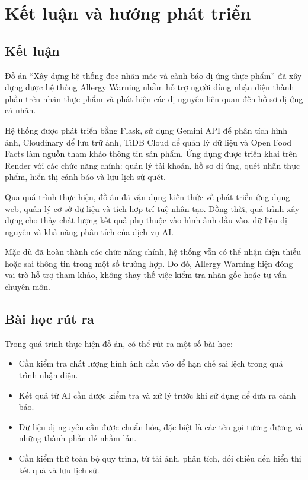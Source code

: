 
\chapter{Kết luận và hướng phát triển}
\label{ch:ketluan}

\section{Kết luận}

Đồ án ``Xây dựng hệ thống đọc nhãn mác và cảnh báo dị ứng thực
phẩm'' đã xây dựng được hệ thống Allergy Warning nhằm hỗ trợ
người dùng nhận diện thành phần trên nhãn thực phẩm và phát hiện
các dị nguyên liên quan đến hồ sơ dị ứng cá nhân.

Hệ thống được phát triển bằng Flask, sử dụng Gemini API để phân
tích hình ảnh, Cloudinary để lưu trữ ảnh, TiDB Cloud để quản lý
dữ liệu và Open Food Facts làm nguồn tham khảo thông tin sản phẩm.
Ứng dụng được triển khai trên Render với các chức năng chính:
quản lý tài khoản, hồ sơ dị ứng, quét nhãn thực phẩm, hiển thị
cảnh báo và lưu lịch sử quét.

Qua quá trình thực hiện, đồ án đã vận dụng kiến thức về phát triển
ứng dụng web, quản lý cơ sở dữ liệu và tích hợp trí tuệ nhân tạo.
Đồng thời, quá trình xây dựng cho thấy chất lượng kết quả phụ thuộc
vào hình ảnh đầu vào, dữ liệu dị nguyên và khả năng phân tích của
dịch vụ AI.

Mặc dù đã hoàn thành các chức năng chính, hệ thống vẫn có thể
nhận diện thiếu hoặc sai thông tin trong một số trường hợp.
Do đó, Allergy Warning hiện đóng vai trò hỗ trợ tham khảo, không
thay thế việc kiểm tra nhãn gốc hoặc tư vấn chuyên môn.

\section{Bài học rút ra}

Trong quá trình thực hiện đồ án, có thể rút ra một số bài học:

\begin{itemize}
	\item Cần kiểm tra chất lượng hình ảnh đầu vào để hạn chế
	sai lệch trong quá trình nhận diện.
	
	\item Kết quả từ AI cần được kiểm tra và xử lý trước khi
	sử dụng để đưa ra cảnh báo.
	
	\item Dữ liệu dị nguyên cần được chuẩn hóa, đặc biệt là
	các tên gọi tương đương và những thành phần dễ nhầm lẫn.
	
	\item Cần kiểm thử toàn bộ quy trình, từ tải ảnh, phân tích,
	đối chiếu đến hiển thị kết quả và lưu lịch sử.
\end{itemize}

